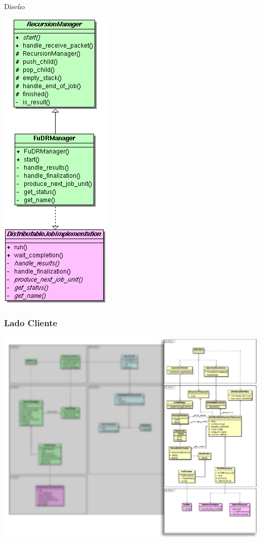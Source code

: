 \begin{subsection}{Diseño}
\begin{frame}
    \begin{center}
       \includegraphics[scale=0.3]{images/fud_manager_dji.png}
    \end{center}

\end{frame}



\begin{frame}\frametitle{Lado Cliente}
    \begin{center}
        \includegraphics[scale=0.25]{images/class-client-side.png}
    \end{center}
\end{frame}


\end{subsection}
